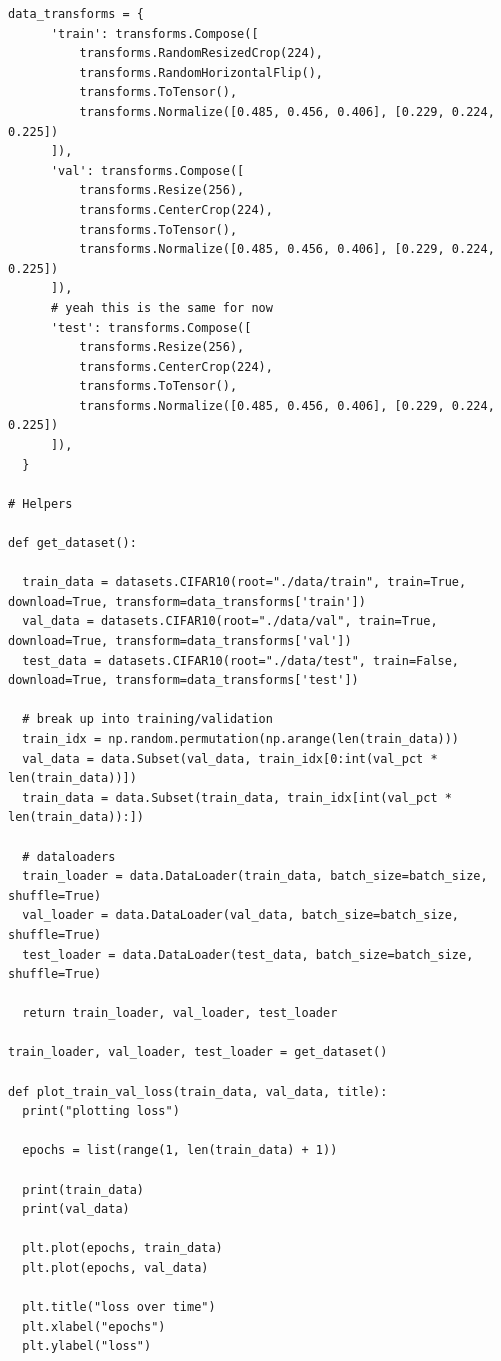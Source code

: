 \documentclass{article}
\newcommand{\1}{\mathbf{1}}
\begin{document}
{\begin{verbatim}
data_transforms = {
      'train': transforms.Compose([
          transforms.RandomResizedCrop(224),
          transforms.RandomHorizontalFlip(),
          transforms.ToTensor(),
          transforms.Normalize([0.485, 0.456, 0.406], [0.229, 0.224, 0.225])
      ]),
      'val': transforms.Compose([
          transforms.Resize(256),
          transforms.CenterCrop(224),
          transforms.ToTensor(),
          transforms.Normalize([0.485, 0.456, 0.406], [0.229, 0.224, 0.225])
      ]),
      # yeah this is the same for now
      'test': transforms.Compose([
          transforms.Resize(256),
          transforms.CenterCrop(224),                                
          transforms.ToTensor(),
          transforms.Normalize([0.485, 0.456, 0.406], [0.229, 0.224, 0.225])
      ]),
  }

# Helpers

def get_dataset():

  train_data = datasets.CIFAR10(root="./data/train", train=True, download=True, transform=data_transforms['train'])
  val_data = datasets.CIFAR10(root="./data/val", train=True, download=True, transform=data_transforms['val'])
  test_data = datasets.CIFAR10(root="./data/test", train=False, download=True, transform=data_transforms['test'])

  # break up into training/validation
  train_idx = np.random.permutation(np.arange(len(train_data)))
  val_data = data.Subset(val_data, train_idx[0:int(val_pct * len(train_data))])
  train_data = data.Subset(train_data, train_idx[int(val_pct * len(train_data)):])

  # dataloaders
  train_loader = data.DataLoader(train_data, batch_size=batch_size, shuffle=True)
  val_loader = data.DataLoader(val_data, batch_size=batch_size, shuffle=True)
  test_loader = data.DataLoader(test_data, batch_size=batch_size, shuffle=True)

  return train_loader, val_loader, test_loader

train_loader, val_loader, test_loader = get_dataset()

def plot_train_val_loss(train_data, val_data, title):
  print("plotting loss")

  epochs = list(range(1, len(train_data) + 1))

  print(train_data)
  print(val_data)

  plt.plot(epochs, train_data)
  plt.plot(epochs, val_data)

  plt.title("loss over time")
  plt.xlabel("epochs")
  plt.ylabel("loss")
  

\end{verbatim}}
\end{document}
